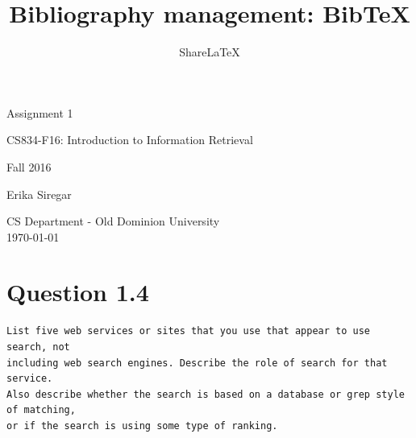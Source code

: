 \documentclass[letterpaper,11pt]{article}
\title{Bibliography management: BibTeX}
\author{Share\LaTeX}
\begin{document}
\begin{titlepage}

\begin{center}

\Huge{Assignment 1}

\Large{CS834-F16:  Introduction to Information Retrieval}

\Large{Fall 2016}


\Large{Erika Siregar}

\vfill

\Large{CS Department - Old Dominion University  \\ \today}


\end{center}

\end{titlepage}


\section*{Question 1.4}
\begin{verbatim}
List five web services or sites that you use that appear to use search, not
including web search engines. Describe the role of search for that service. 
Also describe whether the search is based on a database or grep style of matching,
or if the search is using some type of ranking.
\end{verbatim}
\end{document}
